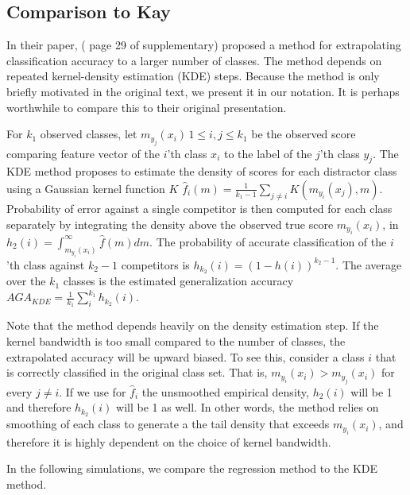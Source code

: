 \documentclass[twoside,11pt]{article}
\begin{document}
\subsection*{Comparison to Kay}
\label{sec:KDEcomparison}
In their paper, \cite{Kay2008a} ( page 29 of supplementary) proposed a
method for extrapolating classification accuracy to a larger number of
classes. The method depends on repeated kernel-density estimation
(KDE) steps. Because the method is only briefly motivated in the
original text, we present it in our notation. It is perhaps worthwhile
to compare this to their original presentation.

For $k_1$ observed classes, let $m_{y_j}(x_i)\, 1\leq i,j\leq k_1$ be
the observed score comparing feature vector of the $i$'th class $x_i$
to the label of the $j$'th class $y_j$. The KDE method proposes to
estimate the density of scores for each distractor class using a
Gaussian kernel function $K$ $\hat{f}_i(m) = \frac{1}{k_1-1}
\sum_{j\neq i} K(m_{y_i}(x_j), m)$. Probability of error against a
single competitor is then computed for each class separately by
integrating the density above the observed true score $m_{y_i}(x_i)$,
in $h_2(i) = \int_{m_{y_i}(x_i)}^\infty \hat{f}(m)dm$. The probability
of accurate classification of the $i$'th class against $k_2-1$
competitors is $h_{k_2}(i) = (1-h(i))^{k_2-1}$. The average over the
$k_1$ classes is the estimated generalization accuracy
$\hat{AGA}_{KDE} = \frac{1}{k_1} \sum_{i}^{k_1} h_{k_2}(i)$.

Note that the method depends heavily on the density estimation
step. If the kernel bandwidth is too small compared to the number of
classes, the extrapolated accuracy will be upward biased.  To see
this, consider a class $i$ that is correctly classified in the
original class set. That is, $m_{y_i}(x_i)>m_{y_j}(x_i)$ for every
$j\neq i$. If we use for $\hat{f}_i$ the unsmoothed empirical density,
$h_2(i)$ will be 1 and therefore $h_{k_2}(i)$ will be 1 as well. In
other words, the method relies on smoothing of each class to generate
a the tail density that exceeds $m_{y_i}(x_i)$, and therefore it is
highly dependent on the choice of kernel bandwidth.

In the following simulations, we compare the regression method to the KDE method. 
\end{document}
